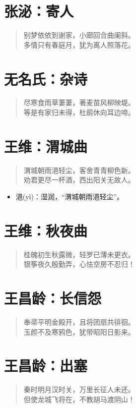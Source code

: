 \documentclass[12pt,oneside]{book}
\newenvironment{shici}{%
\begin{verse}\centering\yanti\large\hspace{12pt}}{\end{verse}}
\begin{document}
\begin{common-format}
\chapter{张泌：寄人}
\begin{shici}
别梦依依到谢家，小廊回合曲阑斜。\\
多情只有春庭月，犹为离人照落花。
\end{shici}

\chapter{无名氏：杂诗}
\begin{shici}
尽寒食雨草萋萋，著麦苗风柳映堤。\\
等是有家归未得，杜鹃休向耳边啼。
\end{shici}

\chapter{王维：渭城曲}
\begin{shici}
渭城朝雨浥轻尘，客舍青青柳色新。\\
劝君更尽一杯酒，西出阳关无故人。
\end{shici}

\begin{itemize}
\item 浥(yì)：湿润，“渭城朝雨浥轻尘”。
\end{itemize}

\chapter{王维：秋夜曲}
\begin{shici}
桂魄初生秋露微，轻罗已薄未更衣。\\
银筝夜久殷勤弄，心怯空房不忍归！
\end{shici}

\chapter{王昌龄：长信怨}
\begin{shici}
奉帚平明金殿开，且将团扇共徘徊。\\
玉颜不及寒鸦色，犹带昭阳日影来。
\end{shici}

\chapter{王昌龄：出塞}
\begin{shici}
秦时明月汉时关，万里长征人未还。\\
但使龙城飞将在，不教胡马渡阴山！
\end{shici}


\end{common-format}
\end{document}
